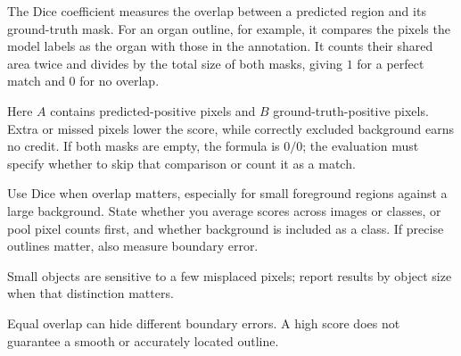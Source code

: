 The Dice coefficient measures the overlap between a predicted region and its ground-truth mask. For an organ outline, for example, it compares the pixels the model labels as the organ with those in the annotation. It counts their shared area twice and divides by the total size of both masks, giving $1$ for a perfect match and $0$ for no overlap.

\begin{metricformula}
\end{metricformula}

Here $A$ contains predicted-positive pixels and $B$ ground-truth-positive pixels. Extra or missed pixels lower the score, while correctly excluded background earns no credit. If both masks are empty, the formula is $0/0$; the evaluation must specify whether to skip that comparison or count it as a match.


Use Dice when overlap matters, especially for small foreground regions against a large background. State whether you average scores across images or classes, or pool pixel counts first, and whether background is included as a class. If precise outlines matter, also measure boundary error.


{
\item Small objects are sensitive to a few misplaced pixels; report results by object size when that distinction matters.
\item Equal overlap can hide different boundary errors. A high score does not guarantee a smooth or accurately located outline.
}

\metricsecondpage

